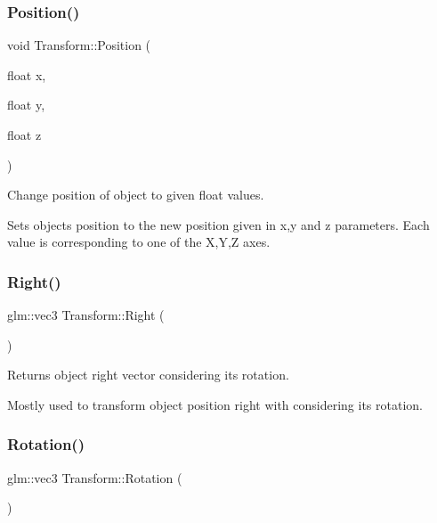 \subsubsection{\texorpdfstring{Position()}{Position()}\hspace{0.1cm}{\footnotesize\ttfamily [3/3]}}
{\footnotesize\ttfamily void Transform\+::\+Position (\begin{DoxyParamCaption}\item[{float}]{x,  }\item[{float}]{y,  }\item[{float}]{z }\end{DoxyParamCaption})\hspace{0.3cm}{\ttfamily [inline]}}



Change position of object to given float values. 

Sets object\textquotesingle{}s position to the new position given in x,y and z parameters. Each value is corresponding to one of the X,Y,Z axes. \mbox{\label{class_transform_ad8a1ed0e1024d93a8722e6d1b8e886c8}} 
\subsubsection{\texorpdfstring{Right()}{Right()}}
{\footnotesize\ttfamily glm\+::vec3 Transform\+::\+Right (\begin{DoxyParamCaption}{ }\end{DoxyParamCaption})\hspace{0.3cm}{\ttfamily [inline]}}



Returns object right vector considering it\textquotesingle{}s rotation. 

Mostly used to transform object position right with considering it\textquotesingle{}s rotation. \mbox{\label{class_transform_a4d1718230fdc4dd8f3a0cf810cf223f4}} 
\subsubsection{\texorpdfstring{Rotation()}{Rotation()}\hspace{0.1cm}{\footnotesize\ttfamily [1/3]}}
{\footnotesize\ttfamily glm\+::vec3 Transform\+::\+Rotation (\begin{DoxyParamCaption}{ }\end{DoxyParamCaption})\hspace{0.3cm}{\ttfamily [inline]}}



